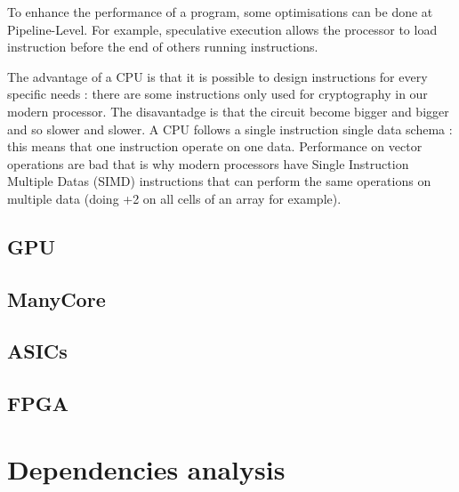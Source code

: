 
To enhance the performance of a program, some optimisations can be done at Pipeline-Level. For example, speculative execution allows the processor to load instruction before the end of others running instructions. 

The advantage of a CPU is that it is possible to design instructions for every specific needs : there are some instructions only used for cryptography in our modern processor. The disavantadge is that the circuit become bigger and bigger and so slower and slower. A CPU follows a single instruction single data  schema : this means that one instruction operate on one data. Performance on vector operations are bad that is why modern processors have Single Instruction Multiple Datas (SIMD) instructions that can perform the same operations on multiple data (doing +2 on all cells of an array for example).

\subsection{GPU}
\subsection{ManyCore}
\subsection{ASICs}
\subsection{FPGA}

\section{Dependencies analysis}